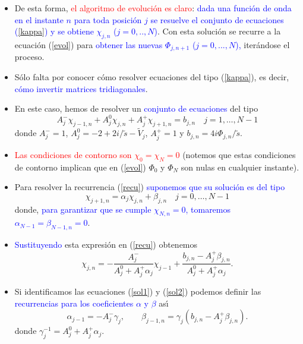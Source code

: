 \documentclass[12pt]{iopart}
\def\az{\textcolor{blue}}
\def\ro{\textcolor{red}}
\begin{document}
\begin{itemize}
\item De esta forma, \ro{el algoritmo de evoluci{\'o}n es claro}: \az{dada una funci{\'o}n de onda en el instante $n$ para
toda posici{\'o}n $j$ se resuelve el conjunto de ecuaciones (\ref{kappa}) y se obtiene $\chi_{j,n}$ ($j=0,..,N$)}. Con esta 
soluci{\'o}n
se recurre a la ecuaci{\'o}n (\ref{evol}) para \az{obtener las nuevas $\Phi_{j,n+1}$ ($j=0,...,N$),} iter\'andose el proceso.

\item S\'olo falta por conocer c\'omo resolver ecuaciones del tipo (\ref{kappa}), es decir, \az{c\'omo invertir 
matrices tridiagonales}.

\item En este caso, hemos de resolver un \az{conjunto de ecuaciones} del tipo
%
\begin{equation}
A_j^{-}\chi_{j-1,n}+A_j^0\chi_{j,n}+A_j^+\chi_{j+1,n}=b_{j,n} \quad j=1,\ldots ,N-1
\label{recu}
\end{equation}
%
donde $A_j^-=1$, $A_j^0=-2+2i/\tilde s-\tilde V_j$, $A_j^+=1$ y $b_{j,n}=4i\Phi_{j,n}/\tilde s$.

\item \ro{Las condiciones de contorno son $\chi_0=\chi_{N}=0$} (notemos que estas condiciones de contorno implican que en (\ref{evol})
 $\Phi_{0}$ y $\Phi_{N}$ son nulas en cualquier instante).

\item Para resolver la recurrencia (\ref{recu}) \az{suponemos que su soluci{\'o}n es del tipo}
%
\begin{equation}
\chi_{j+1,n}=\alpha_{j}\chi_{j,n}+\beta_{j,n}\quad j=0,\ldots,N-1
\label{sol1}
\end{equation}
%
donde, \az{para garantizar que se cumple $\chi_{N,n}=0$, tomaremos  $\alpha_{N-1}=\beta_{N-1,n}=0$}. 

\item \az{Sustituyendo} esta expresi{\'o}n en (\ref{recu}) obtenemos
%
\begin{equation}
\chi_{j,n}=-\frac{A_j^-}{A_j^0+A_j^+\alpha_j}\chi_{j-1}+\frac{b_{j,n}-A_j^+\beta_{j,n}}{A_j^0+A_j^+\alpha_j}.
\label{sol2}
\end{equation}
%

\item Si identificamos las ecuaciones (\ref{sol1}) y (\ref{sol2}) podemos definir las \az{recurrencias para los coeficientes $\alpha$ y
$\beta$} as\'{\i}
%
\begin{equation}
\alpha_ {j-1}=-A_j ^-\gamma_j, \qquad
\beta_{j-1,n}=\gamma_j\left(b_{j,n}-A_j^+\beta_{j,n}  \right).
\label{beta}
\end{equation}
%
donde $\gamma_j^{-1}=A_j^0+A_j^+\alpha_j$. 


\end{itemize}
\end{document}
